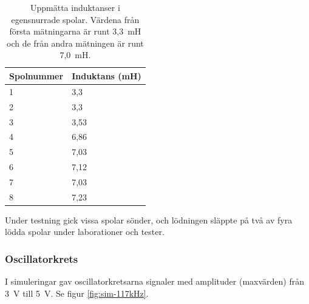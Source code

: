 \documentclass[a4paper]{article}
\begin{document}
\begin{sloppypar}
  \begin{table}[H]
    \begin{center}
      \caption{Uppmätta induktanser i egensnurrade spolar. Värdena från första mätningarna är runt 3,3~mH och de från andra mätningen är runt 7,0~mH.}
      \label{table:inductance}
      \begin{tabular}{| l | l |}
        \hline
        Spolnummer & Induktans (mH) \\
        \hline
        1          & 3,3            \\
        2          & 3,3            \\
        3          & 3,53           \\
        4          & 6,86           \\
        5          & 7,03           \\
        6          & 7,12           \\
        7          & 7,03           \\
        8          & 7,23           \\
        \hline
      \end{tabular}
    \end{center}
  \end{table}
  \noindent
  Under testning gick vissa spolar sönder, och lödningen släppte på två av fyra lödda spolar under laborationer och tester.

  \subsubsection{Oscillatorkrets}
  I simuleringar gav oscillatorkretsarna signaler med amplituder (maxvärden) från 3~V till 5~V. Se figur \ref{fig:sim-117kHz}.


\end{sloppypar}
\end{document}
